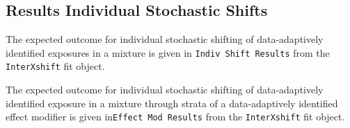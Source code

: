 \documentclass[
]{article}
\newenvironment{Shaded}{\begin{snugshade}}{\end{snugshade}}
\newcommand{\AttributeTok}[1]{\textcolor[rgb]{0.77,0.63,0.00}{#1}}
\newcommand{\FunctionTok}[1]{\textcolor[rgb]{0.00,0.00,0.00}{#1}}
\newcommand{\NormalTok}[1]{#1}
\newcommand{\OtherTok}[1]{\textcolor[rgb]{0.56,0.35,0.01}{#1}}
\newcommand{\SpecialCharTok}[1]{\textcolor[rgb]{0.00,0.00,0.00}{#1}}
\newcommand{\StringTok}[1]{\textcolor[rgb]{0.31,0.60,0.02}{#1}}
\begin{document}
\hypertarget{results-individual-stochastic-shifts}{%
\subsection{Results Individual Stochastic
Shifts}\label{results-individual-stochastic-shifts}}

The expected outcome for individual stochastic shifting of
data-adaptively identified exposures in a mixture is given in
\texttt{Indiv\ Shift\ Results} from the \texttt{InterXshift} fit object.

\begin{Shaded}
\end{Shaded}

The expected outcome for individual stochastic shifting of
data-adaptively identified exposure in a mixture through strata of a
data-adaptively identified effect modifier is given
in\texttt{Effect\ Mod\ Results} from the \texttt{InterXshift} fit object.

\begin{Shaded}
\end{Shaded}
\end{document}
